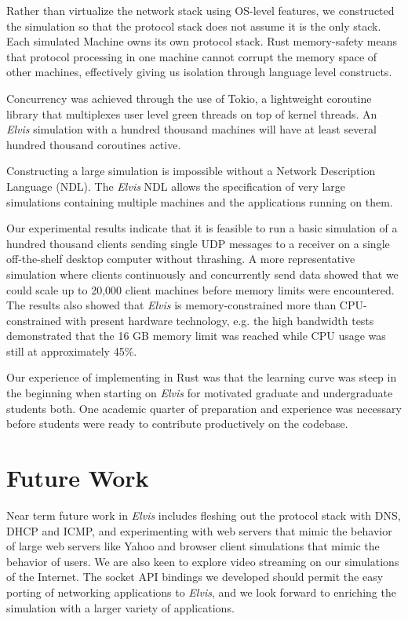 \documentclass[journal]{IEEEtran} %
\newcommand{\elvis}{\textit{Elvis}}
\begin{document}
Rather than virtualize the network stack using OS-level features, we constructed the simulation so that the protocol stack does not assume it is the only stack. Each simulated Machine owns its own protocol stack. Rust memory-safety means that protocol processing in one machine cannot corrupt the memory space of other machines, effectively giving us isolation through language level constructs.

Concurrency was achieved through the use of Tokio, a lightweight coroutine library that multiplexes user level green threads on top of kernel threads. An \elvis{} simulation with a hundred thousand machines will have at least several hundred thousand coroutines active.

Constructing a large simulation is impossible without a Network Description Language (NDL). The \elvis{} NDL allows the specification of very large simulations containing multiple machines and the applications running on them.

Our experimental results indicate that it is feasible to run a basic simulation of a hundred thousand clients sending single UDP messages to a receiver on a single off-the-shelf desktop computer without thrashing. A more representative simulation where clients continuously and concurrently send data showed that we could scale up to 20,000 client machines before memory limits were encountered. The results also showed that \elvis{} is memory-constrained more than CPU-constrained with present hardware technology, e.g. the high bandwidth tests demonstrated that the 16 GB memory limit was reached while CPU usage was still at approximately 45\%.

Our experience of implementing in Rust was that the learning curve was steep in the beginning when starting on \elvis{} for motivated graduate and undergraduate students both. One academic quarter of preparation and experience was necessary before students were ready to contribute productively on the codebase.
\section{Future Work}

Near term future work in \elvis{} includes fleshing out the protocol stack with DNS, DHCP and ICMP, and experimenting with web servers that mimic the behavior of large web servers like Yahoo and browser client simulations that mimic the behavior of users. We are also keen to explore video streaming on our simulations of the  Internet. The socket API bindings we developed should permit the easy porting of networking applications to \elvis{}, and we look forward to enriching the simulation with a larger variety of applications.
\end{document}
